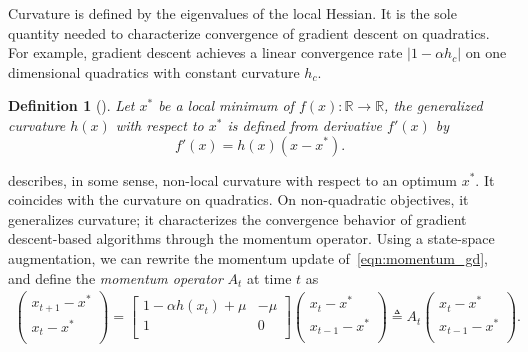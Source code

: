 \documentclass{article} %
\newtheorem{definition}[theorem]{Definition}
\newcommand{\mat}[1]{\bm{\mathit{#1}}}
\begin{document}
Curvature is defined by the eigenvalues of the local Hessian. 
It is the sole quantity needed to characterize convergence of gradient descent on quadratics. For example, gradient descent achieves a linear convergence rate $|1 - \alpha h_c|$ on one dimensional quadratics with constant curvature $h_c$. 

\begin{definition}[\Gc]
\label{def:generalized_curvature}
Let $x^*$ be a local minimum of $f(x):\mathbb{R}\rightarrow\mathbb{R}$, the generalized curvature $h(x)$  with respect to $x^*$ is defined from derivative $f'(x)$ by 
\begin{equation}
	 f'(x) = h(x) (x - x^*). 
	\label{eqn:generalized_curvature}
\end{equation}
\end{definition}

\vspace{-0.2em}
\Gc describes, in some sense, non-local curvature with respect to an optimum $x^*$. It coincides with the curvature on quadratics. On non-quadratic objectives, it generalizes curvature; it characterizes the convergence behavior of gradient descent-based algorithms through the momentum operator.
Using a state-space augmentation, we can rewrite the momentum update of~\eqref{eqn:momentum_gd}, and define the {\em momentum operator} $\mat{A}_t$ at time $t$ as
\begin{align}
{\begin{pmatrix}
x_{t+1} - x^*\\
x_t - x^* \\
\end{pmatrix}}
=
{\begin{bmatrix}
1-\alpha h(x_t) + \mu & - \mu \\
1 & 0 \\
\end{bmatrix}}
{\begin{pmatrix}
x_t - x^* \\
x_{t-1} - x^*\\
\end{pmatrix}}
\triangleq
\mat{A}_t
{\begin{pmatrix}
x_t - x^* \\
x_{t-1} - x^*\\
\end{pmatrix}}.
\label{equ:one_dim_22_rec}
\end{align}
\end{document}
